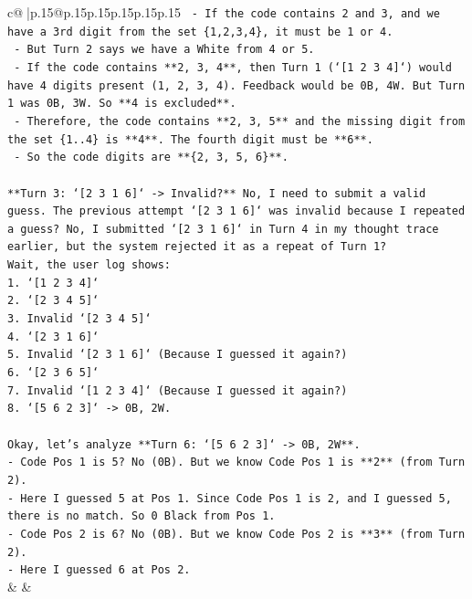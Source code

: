 \documentclass{article}
\begin{document}
{\begin{supertabular}{c@{$\;$}|p{.15\linewidth}@{}p{.15\linewidth}p{.15\linewidth}p{.15\linewidth}p{.15\linewidth}p{.15\linewidth}}
{{{\texttt{    {-} If the code contains 2 and 3, and we have a 3rd digit from the set \{1,2,3,4\}, it must be 1 or 4.} \\
\texttt{    {-} But Turn 2 says we have a White from 4 or 5.} \\
\texttt{    {-} If the code contains **2, 3, 4**, then Turn 1 (`{[}1 2 3 4{]}`) would have 4 digits present (1, 2, 3, 4). Feedback would be 0B, 4W. But Turn 1 was 0B, 3W. So **4 is excluded**.} \\
\texttt{    {-} Therefore, the code contains **2, 3, 5** and the missing digit from the set \{1..4\} is **4**. The fourth digit must be **6**.} \\
\texttt{    {-} So the code digits are **\{2, 3, 5, 6\}**.} \\
\\ 
\texttt{**Turn 3: `{[}2 3 1 6{]}` {-}> Invalid?** No, I need to submit a valid guess. The previous attempt `{[}2 3 1 6{]}` was invalid because I repeated a guess? No, I submitted `{[}2 3 1 6{]}` in Turn 4 in my thought trace earlier, but the system rejected it as a repeat of Turn 1?} \\
\texttt{Wait, the user log shows:} \\
\texttt{1. `{[}1 2 3 4{]}`} \\
\texttt{2. `{[}2 3 4 5{]}`} \\
\texttt{3. Invalid `{[}2 3 4 5{]}`} \\
\texttt{4. `{[}2 3 1 6{]}`} \\
\texttt{5. Invalid `{[}2 3 1 6{]}` (Because I guessed it again?)} \\
\texttt{6. `{[}2 3 6 5{]}`} \\
\texttt{7. Invalid `{[}1 2 3 4{]}` (Because I guessed it again?)} \\
\texttt{8. `{[}5 6 2 3{]}` {-}> 0B, 2W.} \\
\\ 
\texttt{Okay, let's analyze **Turn 6: `{[}5 6 2 3{]}` {-}> 0B, 2W**.} \\
\texttt{{-} Code Pos 1 is 5? No (0B). But we know Code Pos 1 is **2** (from Turn 2).} \\
\texttt{{-} Here I guessed 5 at Pos 1. Since Code Pos 1 is 2, and I guessed 5, there is no match. So 0 Black from Pos 1.} \\
\texttt{{-} Code Pos 2 is 6? No (0B). But we know Code Pos 2 is **3** (from Turn 2).} \\
\texttt{{-} Here I guessed 6 at Pos 2.} \\
            }
        }
    }
    & & \\ \\


\end{supertabular}}
\end{document}
